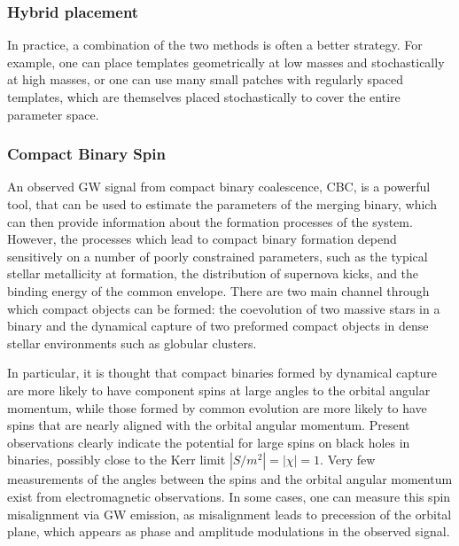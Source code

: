 \documentclass[binding=0.6cm, LaM]{sapthesis}
\begin{document}
\subsubsection{Hybrid placement}

	In practice, a combination of the two methods is often a better strategy. 
	For example, one can place templates geometrically at low masses 
	and stochastically at high masses, or one can use many small patches 
	with regularly spaced templates, which are themselves placed stochastically 
	to cover the entire parameter space. 

\subsubsection{Compact Binary Spin}

	An observed GW signal from compact  binary coalescence, CBC, is a powerful tool, 
	that can be used to estimate the parameters of the merging binary,
	which can then provide information about the formation processes of the system. 
	However, the processes which lead to compact binary formation  
	depend sensitively on a number of poorly constrained parameters, 
	such as the typical stellar metallicity at formation, 
	the distribution of supernova kicks, 
	and the binding energy of the common envelope. 
	There are two main channel through which compact objects can be formed:
	the coevolution of two massive stars in a binary and 
	the dynamical capture of two preformed compact objects 
	in dense stellar environments such as globular clusters.
	
	In particular, it is thought that compact binaries formed by dynamical capture 
	are more likely to have component spins
	at large angles to the orbital angular momentum, 
	while those formed by common evolution are more likely to have 
	spins that are nearly aligned with the orbital angular momentum.
	Present observations clearly indicate the potential for large spins 
	on black holes in binaries, possibly close to the Kerr limit $|S/m^2| = |\chi| = 1$.
	Very few measurements of the angles between the spins and 
	the orbital angular momentum exist from electromagnetic observations. 
	In some cases, one can measure this spin misalignment via GW emission, 
	as misalignment leads to precession of the orbital plane, 
	which appears as phase and amplitude modulations in the observed signal.
\end{document}
